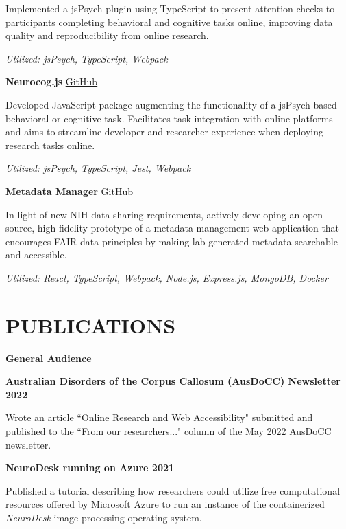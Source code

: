 \documentclass{article}
\begin{document}
  Implemented a jsPsych plugin using TypeScript to present attention-checks to participants completing behavioral and cognitive tasks online, improving data quality and reproducibility from online research.

  \textit{Utilized: jsPsych, TypeScript, Webpack}

  \medbreak

  \textbf{Neurocog.js} \hfill \href{https://github.com/henry-burgess/neurocog.js}{\color{blue}GitHub}

  Developed JavaScript package augmenting the functionality of a jsPsych-based behavioral or cognitive task. Facilitates task integration with online platforms and aims to streamline developer and researcher experience when deploying research tasks online.

  \textit{Utilized: jsPsych, TypeScript, Jest, Webpack}

  \medbreak

  \textbf{Metadata Manager} \hfill \href{https://github.com/henry-burgess/metadata-manager}{\color{blue}GitHub}

  In light of new NIH data sharing requirements, actively developing an open-source, high-fidelity prototype of a metadata management web application that encourages FAIR data principles by making lab-generated metadata searchable and accessible.

  \textit{Utilized: React, TypeScript, Webpack, Node.js, Express.js, MongoDB, Docker}

  \pagebreak

  \section*{\centering\uppercase{Publications}}

  {\large\textbf{General Audience}}

  \textbf{Australian Disorders of the Corpus Callosum (AusDoCC) Newsletter \hfill 2022}

  Wrote an article ``Online Research and Web Accessibility" submitted and published to the ``From our researchers..." column of the May 2022 AusDoCC newsletter.

  \medbreak

  \textbf{NeuroDesk running on Azure \hfill 2021}

  Published a tutorial describing how researchers could utilize free computational resources offered by Microsoft Azure to run an instance of the containerized \textit{NeuroDesk} image processing operating system.
\end{document}
